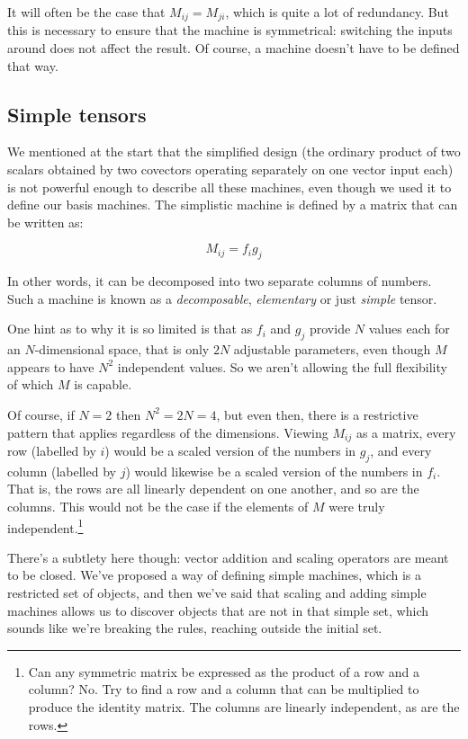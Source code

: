 It will often be the case that $M_{ij} = M_{ji}$, which is quite a lot of redundancy. But this is necessary to ensure that the machine is symmetrical: switching the inputs around does not affect the result. Of course, a machine doesn't have to be defined that way.

\subsection{Simple tensors} \label{simple-tensor}

We mentioned at the start that the simplified design (the ordinary product of two scalars obtained by two covectors operating separately on one vector input each) is not powerful enough to describe all these machines, even though we used it to define our basis machines. The simplistic machine is defined by a matrix that can be written as:

$$
M_{ij} = f_i g_j
$$

In other words, it can be decomposed into two separate columns of numbers. Such a machine is known as a \textit{decomposable}, \textit{elementary} or just \textit{simple} tensor.

One hint as to why it is so limited is that as $f_i$ and $g_j$ provide $N$ values each for an $N$-dimensional space, that is only $2N$ adjustable parameters, even though $M$ appears to have $N^2$ independent values. So we aren't allowing the full flexibility of which $M$ is capable.

Of course, if $N=2$ then $N^2 = 2N = 4$, but even then, there is a restrictive pattern that applies regardless of the dimensions. Viewing $M_{ij}$ as a matrix, every row (labelled by $i$) would be a scaled version of the numbers in $g_j$, and every column (labelled by $j$) would likewise be a scaled version of the numbers in $f_i$. That is, the rows are all linearly dependent on one another, and so are the columns. This would not be the case if the elements of $M$ were truly independent.\footnote{Can any symmetric matrix be expressed as the product of a row and a column? No. Try to find a row and a column that can be multiplied to produce the identity matrix. The columns are linearly independent, as are the rows.}

There's a subtlety here though: vector addition and scaling operators are meant to be closed. We've proposed a way of defining simple machines, which is a restricted set of objects, and then we've said that scaling and adding simple machines allows us to discover objects that are not in that simple set, which sounds like we're breaking the rules, reaching outside the initial set.

